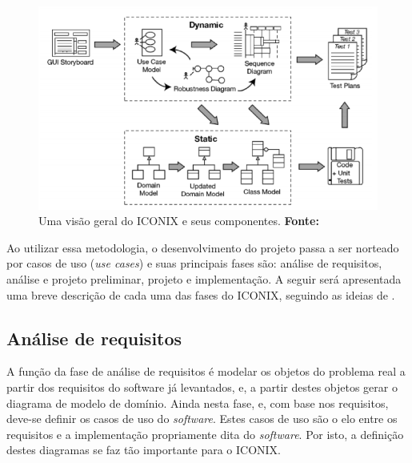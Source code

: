 \begin{figure}[h!]
	\centerline{\includegraphics[scale=0.95]{./imagens/visao_geral_iconix.png}}
	\caption[Uma visão geral do ICONIX e seus componentes.]
	{Uma visão geral do ICONIX e seus componentes. \textbf{Fonte:} }
	\label{fig:visao_geral_iconix_componentes}
\end{figure}

\newpage %

\par Ao utilizar essa metodologia, o desenvolvimento do projeto passa a ser norteado por casos de uso (\textit{use cases}) e suas principais fases são: análise de requisitos, análise e projeto preliminar, projeto e implementação. A seguir será apresentada uma breve descrição de cada uma das fases do ICONIX, seguindo as ideias de .

\subsection{Análise de requisitos}

A função da fase de análise de requisitos é modelar os objetos do problema real a partir dos requisitos do software já levantados, e, a partir destes objetos gerar o diagrama de modelo de domínio. Ainda nesta fase, e, com base nos requisitos, deve-se definir os casos de uso do \textit{software}. Estes casos de uso são o elo entre os requisitos e a implementação propriamente dita do \textit{software}. Por isto, a definição destes diagramas se faz tão importante para o ICONIX. 


